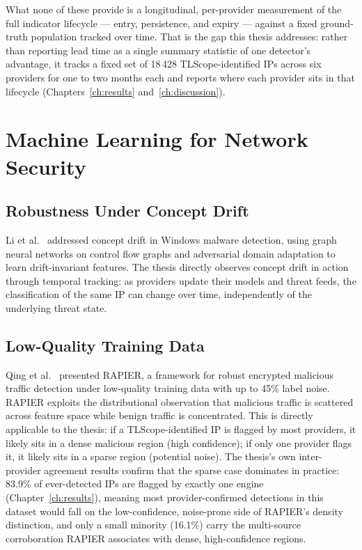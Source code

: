 \documentclass[12pt, a4paper, twoside]{report}
\begin{document}
What none of these provide is a longitudinal, per-provider measurement of the full indicator
lifecycle --- entry, persistence, and expiry --- against a fixed ground-truth population tracked
over time. That is the gap this thesis addresses: rather than reporting lead time as a single
summary statistic of one detector's advantage, it tracks a fixed set of 18\,428 TLScope-identified
IPs across six providers for one to two months each and reports where each provider sits in that
lifecycle (Chapters~\ref{ch:results} and~\ref{ch:discussion}).

\section{Machine Learning for Network Security}

\subsection{Robustness Under Concept Drift}

Li et al.\ \cite{li2025conceptdrift} addressed concept drift in Windows malware detection,
using graph neural networks on control flow graphs and adversarial domain adaptation to learn
drift-invariant features. The thesis directly observes concept drift in action through temporal
tracking: as providers update their models and threat feeds, the classification of the same IP can
change over time, independently of the underlying threat state.

\subsection{Low-Quality Training Data}

Qing et al.\ \cite{qing2024rapier} presented RAPIER, a framework for robust encrypted malicious
traffic detection under low-quality training data with up to 45\% label noise. RAPIER exploits the
distributional observation that malicious traffic is scattered across feature space while benign
traffic is concentrated. This is directly applicable to the thesis: if a TLScope-identified IP is
flagged by most providers, it likely sits in a dense malicious region (high confidence); if only
one provider flags it, it likely sits in a sparse region (potential noise). The thesis's own
inter-provider agreement results confirm that the sparse case dominates in practice: 83.9\% of
ever-detected IPs are flagged by exactly one engine (Chapter~\ref{ch:results}), meaning most
provider-confirmed detections in this dataset would fall on the low-confidence, noise-prone side
of RAPIER's density distinction, and only a small minority (16.1\%) carry the multi-source
corroboration RAPIER associates with dense, high-confidence regions.
\end{document}
